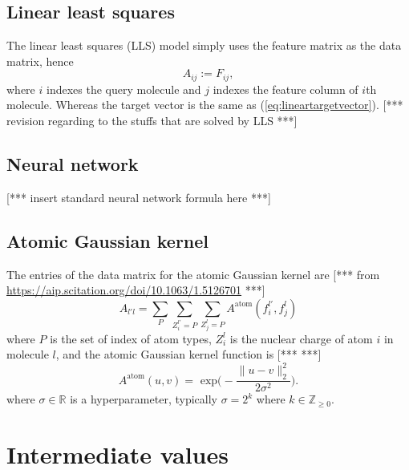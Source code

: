 \documentclass[12pt]{article}
\def\D{\displaystyle}
\def\att{                    %
        \marginpar[ \hspace*{\fill} \raisebox{-0.2em}{\rule{2mm}{1.2em}} ]
        {\raisebox{-0.2em}{\rule{2mm}{1.2em}} }
        }
\def\at#1{[*** \att #1 ***]}  %
\begin{document}
\subsection{Linear least squares}
\label{subsec:LLS}
The linear least squares (LLS) model simply uses the feature matrix as the data matrix, hence
\begin{equation}
	\label{eq:lls}
	A_{ij} := F_{ij},
\end{equation}
where $i$ indexes the query molecule and $j$ indexes the feature column of $i$th molecule. Whereas the target vector is the same as (\ref{eq:lineartargetvector}).
\at{revision regarding to the stuffs that are solved by LLS}

\subsection{Neural network}
\label{subsec:NN}
\at{insert standard neural network formula here}

\subsection{Atomic Gaussian kernel}
The entries of the data matrix for the atomic Gaussian kernel are \at{\cite[Eq. (10)]{Faber et al} from \url{https://aip.scitation.org/doi/10.1063/1.5126701}}
\begin{equation}
	\label{eq:gaussian_atom}
	A_{l' l} = \sum_P \sum_{Z^{l'}_i = P} \sum_{Z^{l}_j = P} A^\text{atom}(f^{l'}_i, f^l_j)
\end{equation}
where $P$ is the set of index of atom types, $Z_i^l$ is the nuclear charge of atom $i$ in molecule $l$, and the atomic Gaussian kernel function is \at{\cite[Eq. (26)]{Faber et al}}
\begin{equation}
	A^\text{atom}(u, v) = \text{ exp}\Big( - \frac{\|u - v \|^2_2}{2 \sigma^2} \Big).
\end{equation}
where $\sigma \in \mathbb{R}$ is a hyperparameter, typically $\sigma = 2^k$ where $k \in \mathbb{Z}_{\geq 0}$.

\iffalse
&= \frac{\D \left(\sum_{k\in K} \frac{E_k + \sum_l \theta_{kl} \phi_{kl}(w)}{D_k(w)} / S_K(w)\right) - \left(E_j + \sum_l \theta_{jl} \phi_{jl}(w)\right)}{D_j(w)S_K(w)-1}, \\
\fi

\section{Intermediate values}
\label{sec:intermediate}
\end{document}
